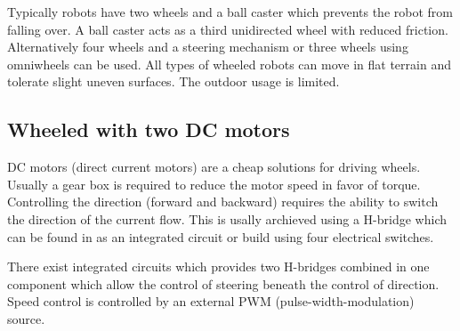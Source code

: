 Typically robots have two wheels and a ball caster which prevents the robot from falling over. A ball caster acts as a third unidirected wheel with reduced friction. Alternatively four wheels and a steering mechanism or three wheels using omniwheels can be used. All types of wheeled robots can move in flat terrain and tolerate slight uneven surfaces. The outdoor usage is limited.
\subsection{Wheeled with two DC motors}
DC motors (direct current motors) are a cheap solutions for driving wheels. Usually a gear box is required to reduce the motor speed in favor of torque. Controlling the direction (forward and backward) requires the ability to switch the direction of the current flow. This is usally archieved using a H-bridge which can be found in as an integrated circuit or build using four electrical switches. 

There exist integrated circuits which provides two H-bridges combined in one component which allow the control of steering beneath the control of direction. Speed control is controlled by an external PWM (pulse-width-modulation) source.

